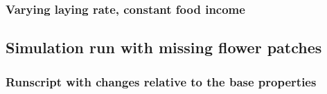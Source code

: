 	\subsubsection{Varying laying rate, constant food income}
		\label{chap:sim_R0_2}
\subsection{Simulation run with missing flower patches}
\label{chap:sim_R1}
	\subsubsection{Runscript with changes relative to the base properties}
		
